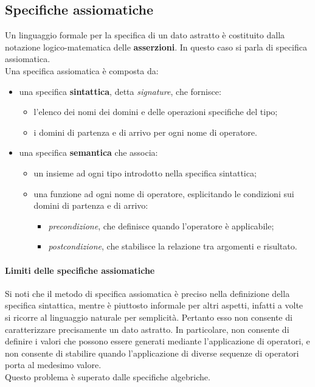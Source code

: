 \documentclass[12pt]{report}
\begin{document}
 	\subsection{Specifiche assiomatiche}
 	Un linguaggio formale per la specifica di un dato astratto è costituito dalla notazione logico-matematica delle \textbf{asserzioni}. In questo caso si parla di specifica assiomatica. \\
 	Una specifica assiomatica è composta da:
 	\begin{itemize}
 		\item una specifica \textbf{sintattica}, detta \textit{signature}, che fornisce:
 		\begin{itemize}
 			\item l'elenco dei nomi dei domini e delle operazioni specifiche del tipo;
 			\item i domini di partenza e di arrivo per ogni nome di operatore.
 		\end{itemize}
 		\item una specifica \textbf{semantica} che associa:
 		\begin{itemize}
 			\item un insieme ad ogni tipo introdotto nella specifica sintattica;
 			\item una funzione ad ogni nome di operatore, esplicitando le condizioni sui domini di partenza e di arrivo:
 			\begin{itemize}
 				\item \textit{precondizione}, che definisce quando l'operatore è applicabile;
 				\item \textit{postcondizione}, che stabilisce la relazione tra argomenti e risultato.
 			\end{itemize}
 		\end{itemize}
 	\end{itemize}
 	\paragraph{Limiti delle specifiche assiomatiche}
 	Si noti che il metodo di specifica assiomatica è preciso nella definizione della specifica sintattica, mentre è piuttosto informale per altri aspetti, infatti a volte si ricorre al linguaggio naturale per semplicità. Pertanto esso non consente di caratterizzare precisamente un dato astratto. In particolare, non consente di definire i valori che possono essere generati mediante l'applicazione di operatori, e non consente di stabilire quando l'applicazione di diverse sequenze di operatori porta al medesimo valore. \\
 	Questo problema è superato dalle specifiche algebriche.
\end{document}
